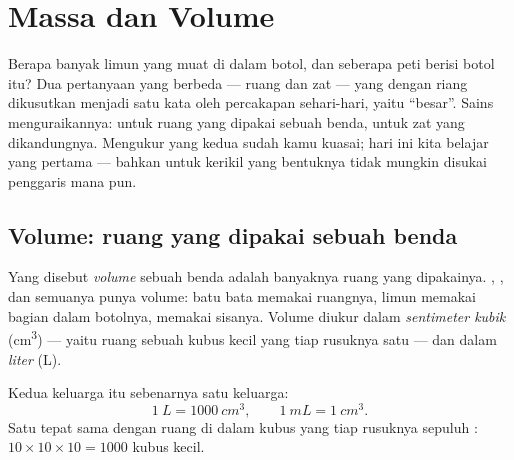 \chapter{Massa dan Volume}\label{ch:g6:mass-and-volume}

Berapa banyak limun yang muat di dalam botol, dan seberapa  peti
berisi botol itu? Dua pertanyaan yang berbeda --- ruang dan zat ---
yang dengan riang dikusutkan menjadi satu kata oleh percakapan
sehari-hari, yaitu ``besar''. Sains menguraikannya:  untuk ruang
yang dipakai sebuah benda,  untuk zat yang dikandungnya. Mengukur
yang kedua sudah kamu kuasai; hari ini kita belajar  yang
pertama --- bahkan untuk kerikil yang bentuknya tidak mungkin disukai
penggaris mana pun.

\section{Volume: ruang yang dipakai sebuah benda}

\begin{definition}[Volume]\label{def:g6:mass-and-volume:volume}
Yang disebut \emph{volume} sebuah benda adalah banyaknya
ruang yang dipakainya. , , dan  semuanya punya
volume: batu bata memakai ruangnya, limun memakai bagian dalam
botolnya,  memakai sisanya. Volume diukur dalam
\emph{sentimeter kubik} (\unit{cm^3}) --- yaitu
ruang sebuah kubus kecil yang tiap rusuknya satu  --- dan
dalam \emph{liter} (\unit{L}).
\end{definition}

\begin{proposition}\label{prop:g6:mass-and-volume:litre}
Kedua keluarga   itu sebenarnya satu keluarga:
\[
\qty{1}{L} = \qty{1000}{cm^3},
\qquad
\qty{1}{mL} = \qty{1}{cm^3}.
\]
Satu  tepat sama dengan ruang di dalam kubus yang tiap rusuknya
sepuluh : $10 \times 10 \times 10 = 1000$ kubus kecil.
\end{proposition}

